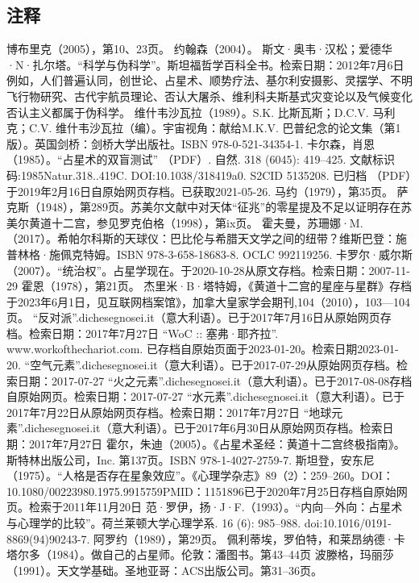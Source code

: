 \subsection{注释}
 博布里克（2005），第10、23页。
 约翰森（2004）。
 斯文·奥韦·汉松；爱德华·N·扎尔塔。“科学与伪科学”。斯坦福哲学百科全书。检索日期：2012年7月6日例如，人们普遍认同，创世论、占星术、顺势疗法、基尔利安摄影、灵摆学、不明飞行物研究、古代宇航员理论、否认大屠杀、维利科夫斯基式灾变论以及气候变化否认主义都属于伪科学。
 维什韦沙瓦拉（1989）。S.K. 比斯瓦斯；D.C.V. 马利克；C.V. 维什韦沙瓦拉（编）。宇宙视角：献给M.K.V. 巴普纪念的论文集（第1版）。英国剑桥：剑桥大学出版社。ISBN 978-0-521-34354-1.
 卡尔森，肖恩（1985）。“占星术的双盲测试” （PDF）. 自然. 318 (6045): 419–425. 文献标识码:1985Natur.318..419C. DOI:10.1038/318419a0. S2CID 5135208. 已归档 （PDF）于2019年2月16日自原始网页存档。已获取2021-05-26.
 马约（1979），第35页。
 萨克斯（1948），第289页。苏美尔文献中对天体“征兆”的零星提及不足以证明存在苏美尔黄道十二宫，参见罗克伯格（1998），第ix页。
 霍夫曼，苏珊娜·M.（2017）。希帕尔科斯的天球仪：巴比伦与希腊天文学之间的纽带？维斯巴登：施普林格·施佩克特姆。ISBN 978-3-658-18683-8. OCLC 992119256.
 卡罗尔·威尔斯（2007）。“统治权”。占星学现在。于2020-10-28从原文存档。检索日期：2007-11-29
 霍恩（1978），第21页。
 杰里米·B·塔特姆，《黄道十二宫的星座与星群》存档于2023年6月1日，见互联网档案馆》，加拿大皇家学会期刊,104（2010），103—104页。
 “反对派”.dichesegnosei.it（意大利语）。已于2017年7月16日从原始网页存档。检索日期：2017年7月27日
 “WoC :: 塞弗·耶齐拉”. www.workofthechariot.com. 已存档自原始页面于2023-01-20。检索日期2023-01-20.
 “空气元素”.dichesegnosei.it（意大利语）。已于2017-07-29从原始网页存档。检索日期：2017-07-27
 “火之元素”.dichesegnosei.it（意大利语）。已于2017-08-08存档自原始网页。检索日期：2017-07-27
 “水元素”.dichesegnosei.it（意大利语）。已于2017年7月22日从原始网页存档。检索日期：2017年7月27日
 “地球元素”.dichesegnosei.it（意大利语）。已于2017年6月30日从原始网页存档。检索日期：2017年7月27日
 霍尔，朱迪（2005）。《占星术圣经：黄道十二宫终极指南》。斯特林出版公司，Inc. 第137页。ISBN 978-1-4027-2759-7.
 斯坦登，安东尼（1975）。“人格是否存在星象效应”。《心理学杂志》89（2）：259–260。DOI：10.1080/00223980.1975.9915759PMID：1151896已于2020年7月25日存档自原始网页。检索于2011年11月20日
 范·罗伊，扬·J·F.（1993）。“内向—外向：占星术与心理学的比较”。荷兰莱顿大学心理学系. 16 (6): 985–988. doi:10.1016/0191-8869(94)90243-7.
 阿罗约（1989），第29页。
 佩利蒂埃，罗伯特，和莱昂纳德·卡塔尔多（1984）。做自己的占星师。伦敦：潘图书。第43–44页
 波滕格，玛丽莎（1991）。天文学基础。圣地亚哥：ACS出版公司。第31–36页。
